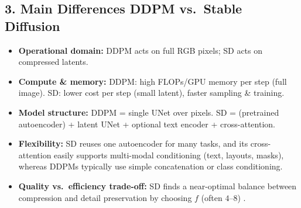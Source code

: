\subsection*{3. Main Differences DDPM vs.\ Stable Diffusion}
\begin{itemize}
  \item \textbf{Operational domain:}  
    DDPM acts on full RGB pixels; SD acts on compressed latents.  
  \item \textbf{Compute \& memory:}  
    DDPM: high FLOPs/GPU memory per step (full image).  
    SD: lower cost per step (small latent), faster sampling & training.
  \item \textbf{Model structure:}  
    DDPM = single UNet over pixels.  
    SD = (pretrained autoencoder) + latent UNet + optional text encoder + cross-attention.
  \item \textbf{Flexibility:}  
    SD reuses one autoencoder for many tasks, and its cross-attention easily supports multi-modal conditioning (text, layouts, masks), whereas DDPMs typically use simple concatenation or class conditioning.
  \item \textbf{Quality vs.\ efficiency trade-off:}  
    SD finds a near-optimal balance between compression and detail preservation by choosing $f$ (often $4$–$8$) .
\end{itemize}


